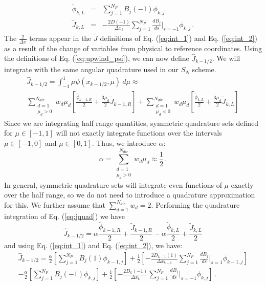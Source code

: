 \documentclass[11pt]{article}
\newcommand{\benum}{\begin{equation}}
\newcommand{\eenum}{\end{equation}}
\newcommand{\beanum}{\begin{eqnarray}}
\newcommand{\eeanum}{\end{eqnarray}}
\newcommand{\eqt}[1]{Eq. (\ref{#1})}
\newcommand{\B}[1]{\ensuremath{{B_{#1} }}}
\newcommand{\p}{\ensuremath{ d}}
\newcommand{\pep}{\, .}
\begin{document}
\begin{subequations}
\label{eq:int_2}
\beanum
\widetilde{\phi}_{k,L} &=& \sum_{j=1}^{N_P}{ \B{j}(-1) \phi_{k,j} } \\
\widetilde{J}_{k,L} &=& -\frac{2D(-1)}{\Delta x_k}\sum_{j=1}^{N_P}{ \frac{\p \B{j}}{\p s}  \bigg \lvert_{s=-1} \phi_{k,j} } \pep
\eeanum
\end{subequations}
The $\frac{2}{\Delta x}$ terms appear in the $\widetilde{J}$ definitions of \eqt{eq:int_1} and \eqt{eq:int_2} as a result of the change of variables from physical to reference coordinates.
Using the definitions of \eqt{eq:upwind_psi}, we can now define $\widehat{J}_{k-1/2}$.  We will integrate with the same angular quadrature used in our $S_N$ scheme.  
\begin{multline}
\label{eq:jquad}
\widehat{J}_{k-1/2} = \int_{-1}^1{\mu \psi(x_{k-1/2},\mu)~d\mu} \approx \\
\sum_{\substack{d=1 \\ \mu_d > 0}}^{N_{dir}}{w_d\mu_d\left[\frac{\widetilde{\phi}_{k-1,R}}{2} + \frac{3\mu_d}{2}\widetilde{J}_{k-1,R}  \right] } 
+ \sum_{\substack{d=1 \\ \mu_d < 0}}^{N_{dir}}{w_d\mu_d \left[ \frac{\widetilde{\phi}_{k,L}}{2} + \frac{3\mu_d}{2}\widetilde{J}_{k,L} \right] }
\end{multline}
Since we are integrating half range quantities, symmetric quadrature sets defined for $\mu\in[-1,1]$ will not exactly integrate functions over the intervals $\mu \in[-1,0]$ and $\mu\in[0,1]$.
Thus, we introduce $\alpha$:
\benum
\alpha = \sum_{\substack{d=1\\ \mu_d > 0}}^{N_{dir}}{w_d \mu_d} \approx \frac{1}{2} \pep
\eenum
In general, symmetric quadrature sets will integrate even functions of $\mu$ exactly over the half range, so we do not need to introduce a quadrature approximation for this.  We further assume that $\sum_{d=1}^{N_{dir}}{w_d} = 2$.  Performing the quadrature integration of \eqt{eq:jquad} we have
%
%
\benum
\widehat{J}_{k-1/2} = \alpha \frac{\widetilde{\phi}_{k-1,R}}{2} + \frac{\widetilde{J}_{k-1,R}}{2} - \alpha \frac{\widetilde{\phi}_{k,L}}{2} + \frac{\widetilde{J}_{k,L}}{2}
\eenum
and using \eqt{eq:int_1} and \eqt{eq:int_2}, we have:
\begin{multline}
\widehat{J}_{k-1/2} = 
\frac{\alpha}{2}\left[\sum_{j=1}^{N_P}{ \B{j}(1) \phi_{k-1,j} }\right] + 
\frac{1}{2}\left[ -\frac{2D_{k-1}(1)}{\Delta x_{k-1}} \sum_{j=1}^{N_P}{ \frac{\p \B{j}}{\p s} \bigg \lvert_{s=1} \phi_{k-1,j} } \right] \\
- \frac{\alpha}{2}\left[ \sum_{j=1}^{N_P}{ \B{j}(-1) \phi_{k,j} } \right] 
+ \frac{1}{2}\left[-\frac{2D_k(-1)}{\Delta x_k}\sum_{j=1}^{N_P}{ \frac{\p \B{j}}{\p s}  \bigg \lvert_{s=-1} \phi_{k,j} }\right] 
\pep
\end{multline}
\end{document}
